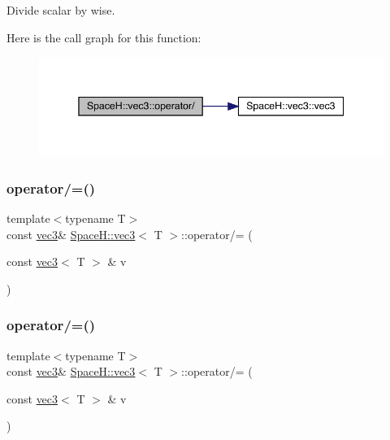 Divide scalar by wise. 

Here is the call graph for this function\+:
\nopagebreak
\begin{figure}[H]
\begin{center}
\leavevmode
\includegraphics[width=345pt]{struct_space_h_1_1vec3_af3f90f3a0f92d6ee7bd8b413b14d2aaf_cgraph}
\end{center}
\end{figure}
\mbox{\label{struct_space_h_1_1vec3_a0de32a9762524bf50e592c5a463c29e2}} 
\subsubsection{\texorpdfstring{operator/=()}{operator/=()}\hspace{0.1cm}{\footnotesize\ttfamily [1/7]}}
{\footnotesize\ttfamily template$<$typename T$>$ \\
const \mbox{\hyperlink{struct_space_h_1_1vec3}{vec3}}\& \mbox{\hyperlink{struct_space_h_1_1vec3}{Space\+H\+::vec3}}$<$ T $>$\+::operator/= (\begin{DoxyParamCaption}\item[{const \mbox{\hyperlink{struct_space_h_1_1vec3}{vec3}}$<$ T $>$ \&}]{v }\end{DoxyParamCaption})\hspace{0.3cm}{\ttfamily [inline]}}

\mbox{\label{struct_space_h_1_1vec3_a0de32a9762524bf50e592c5a463c29e2}} 
\subsubsection{\texorpdfstring{operator/=()}{operator/=()}\hspace{0.1cm}{\footnotesize\ttfamily [2/7]}}
{\footnotesize\ttfamily template$<$typename T$>$ \\
const \mbox{\hyperlink{struct_space_h_1_1vec3}{vec3}}\& \mbox{\hyperlink{struct_space_h_1_1vec3}{Space\+H\+::vec3}}$<$ T $>$\+::operator/= (\begin{DoxyParamCaption}\item[{const \mbox{\hyperlink{struct_space_h_1_1vec3}{vec3}}$<$ T $>$ \&}]{v }\end{DoxyParamCaption})\hspace{0.3cm}{\ttfamily [inline]}}

